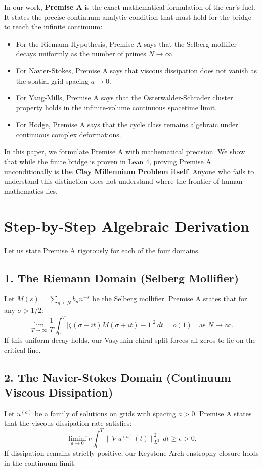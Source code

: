 \documentclass[11pt,a4paper]{article}
\theoremstyle{definition}
\begin{document}
In our work, \textbf{Premise A} is the exact mathematical formulation of the car's fuel. It states the precise continuum analytic condition that must hold for the bridge to reach the infinite continuum:
\begin{itemize}
    \item For the Riemann Hypothesis, Premise A says that the Selberg mollifier decays uniformly as the number of primes $N \to \infty$.
    \item For Navier-Stokes, Premise A says that viscous dissipation does not vanish as the spatial grid spacing $a \to 0$.
    \item For Yang-Mills, Premise A says that the Osterwalder-Schrader cluster property holds in the infinite-volume continuous spacetime limit.
    \item For Hodge, Premise A says that the cycle class remains algebraic under continuous complex deformations.
\end{itemize}
In this paper, we formulate Premise A with mathematical precision. We show that while the finite bridge is proven in Lean 4, proving Premise A unconditionally is \textbf{the Clay Millennium Problem itself}. Anyone who fails to understand this distinction does not understand where the frontier of human mathematics lies.


\section{Step-by-Step Algebraic Derivation}

Let us state Premise A rigorously for each of the four domains.

\subsection{1. The Riemann Domain (Selberg Mollifier)}
Let $M(s) = \sum_{n \le N} b_n n^{-s}$ be the Selberg mollifier. Premise A states that for any $\sigma > 1/2$:
\begin{equation}
\lim_{T \to \infty} \frac{1}{T} \int_0^T |\zeta(\sigma + it) M(\sigma + it) - 1|^2 \, dt = o(1) \quad \text{as } N \to \infty.
\end{equation}
If this uniform decay holds, our Vasyunin chiral split forces all zeros to lie on the critical line.

\subsection{2. The Navier-Stokes Domain (Continuum Viscous Dissipation)}
Let $u^{(a)}$ be a family of solutions on grids with spacing $a > 0$. Premise A states that the viscous dissipation rate satisfies:
\begin{equation}
\liminf_{a \to 0} \nu \int_0^T \|\nabla u^{(a)}(t)\|_{L^2}^2 \, dt \ge \epsilon > 0.
\end{equation}
If dissipation remains strictly positive, our Keystone Arch enstrophy closure holds in the continuum limit.
\end{document}
